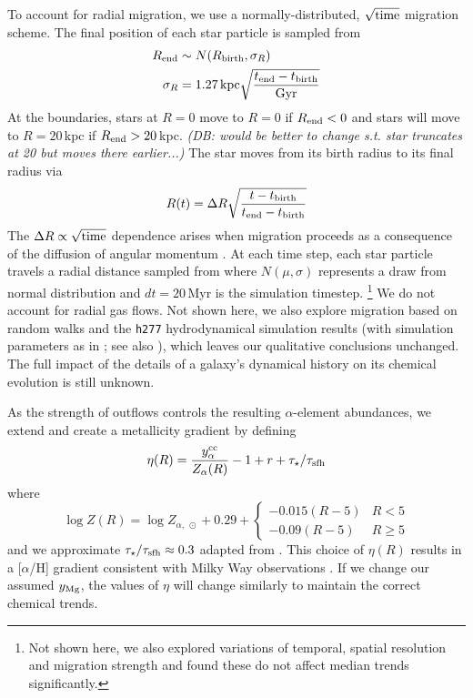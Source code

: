 \documentclass[fleqn,
usenatbib]{mnras}
\newcommand{\JJ}{\citetalias{james+21}}
\newcommand{\dbnote}[1]{{\color{Thistle} \textit{\small (DB: #1)}}}
\begin{document}
To account for radial migration, we use a normally-distributed, $\sqrt{\rm time}$ migration scheme. The final position of each star particle is sampled from
\begin{subequations}
\begin{align}
        R_{\rm end} &\sim N(R_{\rm birth}, \sigma_R ) \\
        \sigma_{R} &= 1.27\,{\rm kpc} \sqrt{\frac{t_{\rm end} - t_{\rm birth}}{\rm Gyr}}
\end{align}
\end{subequations}
At the boundaries, stars at $R=0$ move to $R=0$ if $R_{\rm end}<0$ and stars will move to $R=20$\,kpc if $R_{\rm end} > 20$\,kpc. \dbnote{would be better to change s.t. star truncates at 20 but moves there earlier...}
The star moves from its birth radius to its final radius via
\begin{equation}
        R(t) = \Delta R \sqrt{\frac{t - t_{\rm birth}}{t_{\rm end} - t_{\rm birth}}}
\end{equation}
The $\Delta R \propto \sqrt{\rm time}$ dependence arises when migration proceeds as a consequence of the diffusion of angular momentum \citep{frankel18, frankel20}.
At each time step, each star particle travels a radial distance sampled from 
where $N(\mu, \sigma)$ represents a draw from normal distribution and $dt=20$\,Myr is the simulation timestep.%
\footnote{Not shown here, we also explored variations of temporal, spatial resolution and migration strength and found these do not affect median trends significantly.}
We do not account for radial gas flows.
Not shown here, we also explore migration based on random walks and the \texttt{h277} hydrodynamical
simulation results (with simulation parameters as in \citealt{bird+21}; see also \citealt{christensen12, zolotov12, loebman12, BZ14}), which leaves our qualitative conclusions unchanged. 
The full impact of the details of a galaxy's dynamical history on its chemical evolution is still unknown.

As the strength of outflows controls the resulting $\alpha$-element abundances, we extend \JJ and create a metallicity gradient by defining
\begin{equation}\label{eq:mass_loading}
\eta(R) = \frac{y_{\alpha}^{\rm cc}}{Z_{\alpha}(R)} -1 + r + \tau_{\star} / \tau_{\rm sfh} 
\end{equation}
where 
\begin{equation}
    \log Z(R) = \log Z_{\alpha,\ \odot} + 
    0.29 + 
    \begin{cases}
        -0.015(R-5) & R < 5 \\
        -0.09(R-5) & R \geq 5
    \end{cases}
\end{equation}
and we approximate $\tau_\star/\tau_{\rm sfh} \approx 0.3$ 
adapted from \citet{hayden+14}.
This choice of $\eta(R)$ results in a [$\alpha$/H] gradient consistent with Milky Way observations \citep[e.g.][]{hayden+14, weinberg+19, frinchaboy+13}.
If we change our assumed $y_{\rm Mg}$, the values of $\eta$ will change similarly to maintain the correct chemical trends.
\end{document}
